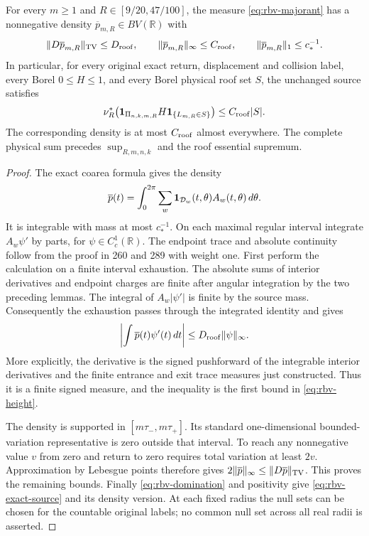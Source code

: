 \begin{theorem}
\label{thm:rbv-height}
For every $m\ge1$ and $R\in[9/20,47/100]$, the measure
\eqref{eq:rbv-majorant} has a nonnegative density
$\overline p_{m,R}\in BV(\mathbb R)$ with
\begin{equation}\label{eq:rbv-height}
 \|D\overline p_{m,R}\|_{\rm TV}\le D_{\rm roof},\qquad
 \|\overline p_{m,R}\|_\infty\le C_{\rm roof},\qquad
 \|\overline p_{m,R}\|_1\le c_*^{-1}.
\end{equation}
In particular, for every original exact return, displacement and
collision label, every Borel $0\le H\le1$, and every Borel physical
roof set $S$, the unchanged source satisfies
\begin{equation}\label{eq:rbv-exact-source}
 \nu_R^*\bigl(\mathbf1_{\Pi_{n,k,m,R}}H\mathbf1_{\{L_{m,R}\in S\}}\bigr)
                         \le C_{\rm roof}|S|.
\end{equation}
The corresponding density is at most $C_{\rm roof}$ almost
everywhere.  The complete physical sum precedes
$\sup_{R,m,n,k}$ and the roof essential supremum.
\end{theorem}
\begin{proof}
The exact coarea formula gives the density
\[
 \overline p(t)=\int_0^{2\pi}\sum_w
               \mathbf1_{\mathcal D_w}(t,\theta)A_w(t,\theta)\,d\theta.
\]
It is integrable with mass at most $c_*^{-1}$.  On each maximal
regular interval integrate $A_w\psi'$ by parts, for
$\psi\in C_c^1(\mathbb R)$.  The endpoint trace and absolute
continuity follow from the proof in 260 and 289 with weight one.
First perform the calculation on a finite interval exhaustion.
The absolute sums of interior derivatives and endpoint charges are
finite after angular integration by the two preceding lemmas.
The integral of $A_w|\psi'|$ is finite by the source mass.
Consequently the exhaustion passes through the integrated identity
and gives
\[
 \left|\int\overline p(t)\psi'(t)\,dt\right|
                  \le D_{\rm roof}\|\psi\|_\infty.
\]
More explicitly, the derivative is the signed pushforward of the
integrable interior derivatives and the finite entrance and exit
trace measures just constructed.  Thus it is a finite signed
measure, and the inequality is the first bound in
\eqref{eq:rbv-height}.

The density is supported in $[m\tau_-,m\tau_+]$.  Its standard
one-dimensional bounded-variation representative is zero outside
that interval.  To reach any nonnegative value $v$ from zero and
return to zero requires total variation at least $2v$.
Approximation by Lebesgue points therefore gives
$2\|\overline p\|_\infty\le\|D\overline p\|_{\rm TV}$.
This proves the remaining bounds.  Finally
\eqref{eq:rbv-domination} and positivity give
\eqref{eq:rbv-exact-source} and its density version.  At each fixed
radius the null sets can be chosen for the countable original
labels; no common null set across all real radii is asserted.
\end{proof}

